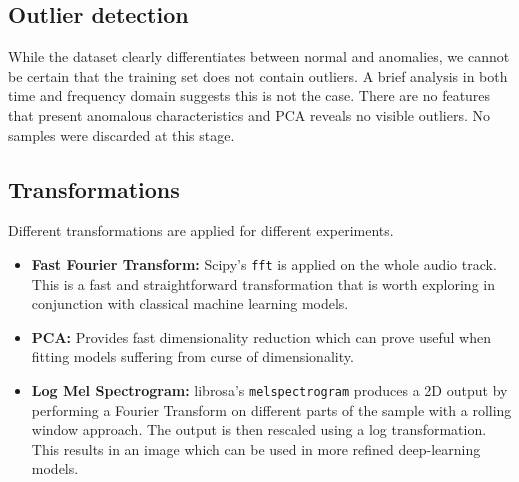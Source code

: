 \documentclass{article}
\begin{document}
    \subsection{Outlier detection}
	While the dataset clearly differentiates between normal and anomalies, we cannot be certain that the training set does not contain outliers.
	A brief analysis in both time and frequency domain suggests this is not the case. There are no features that present anomalous characteristics and PCA reveals no visible outliers. No samples were discarded at this stage.
	
   	\subsection{Transformations}
   	Different transformations are applied for different experiments. 
	\begin{itemize}
		\item \textbf{Fast Fourier Transform:} Scipy's \texttt{fft} is applied on the whole audio track. This is a fast and straightforward transformation that is worth exploring in conjunction with classical machine learning models.
		\item \textbf{PCA:} Provides fast dimensionality reduction which can prove useful when fitting models suffering from curse of dimensionality.
		\item \textbf{Log Mel Spectrogram:} librosa's \texttt{melspectrogram} produces a 2D output by performing a Fourier Transform on different parts of the sample with a rolling window approach. The output is then rescaled using a log transformation. This results in an image which can be used in more refined deep-learning models.
	\end{itemize}
    
\end{document}
